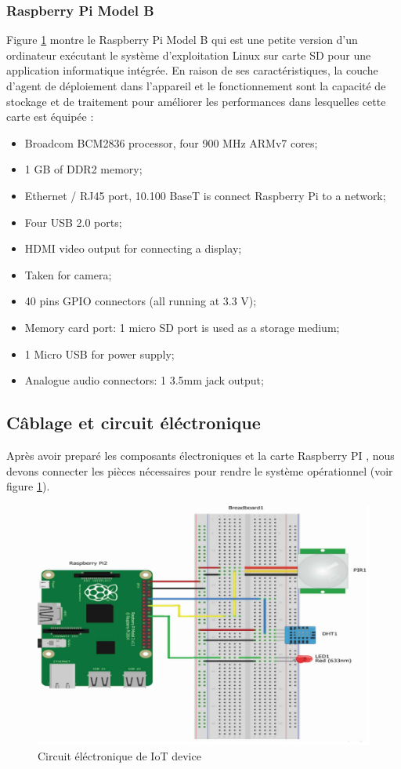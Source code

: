 \subsubsection{Raspberry Pi Model B}
Figure \ref{ceiotdev} montre le Raspberry Pi Model B  qui est une petite version d'un ordinateur exécutant le système d'exploitation Linux sur carte SD pour une application informatique intégrée. En raison de ses caractéristiques, la couche d'agent de déploiement dans l'appareil et le fonctionnement sont la capacité de stockage et de traitement pour améliorer les performances dans lesquelles cette carte est équipée :
\begin{itemize}
    \item	Broadcom BCM2836 processor, four 900 MHz ARMv7 cores;
\item 1 GB of DDR2 memory;
\item Ethernet / RJ45 port, 10.100 BaseT is connect Raspberry Pi to a network;
\item Four USB 2.0 ports;
\item HDMI video output for connecting a display;
\item Taken for camera;
\item 40 pins GPIO connectors (all running at 3.3 V);
\item Memory card port: 1 micro SD port is used as a storage medium;
\item 1 Micro USB for power supply;
\item Analogue audio connectors: 1 3.5mm jack output;
\end{itemize}

\subsection{Câblage et circuit éléctronique}
Après avoir  preparé les composants électroniques et la carte Raspberry PI , nous devons connecter les pièces nécessaires pour rendre le système opérationnel (voir figure \ref{ceiotdev}). 


\begin{figure}[H]
    \centering
    \includegraphics[scale=1.2]{chap1/fc26.png}
    \caption{Circuit éléctronique de IoT device}
    \label{ceiotdev}
\end{figure}
